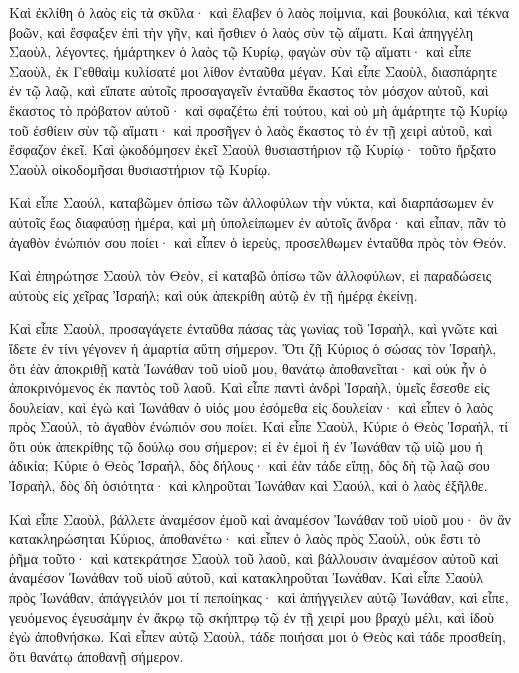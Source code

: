 {Καὶ ἐκλίθη ὁ λαὸς εἰς τὰ σκῦλα· καὶ ἔλαβεν ὁ λαὸς ποίμνια, καὶ βουκόλια, καὶ τέκνα βοῶν, καὶ ἔσφαξεν ἐπὶ τὴν γῆν, καὶ ἤσθιεν ὁ λαὸς σὺν τῷ αἵματι.
Καὶ ἀπηγγέλη Σαοὺλ, λέγοντες, ἡμάρτηκεν ὁ λαὸς τῷ Κυρίῳ, φαγὼν σὺν τῷ αἵματι· καὶ εἶπε Σαοὺλ, ἐκ Γεθθαὶμ κυλίσατέ μοι λίθον ἐνταῦθα μέγαν.
Καὶ εἶπε Σαοὺλ, διασπάρητε ἐν τῷ λαῷ, καὶ εἴπατε αὐτοῖς προσαγαγεῖν ἐνταῦθα ἕκαστος τὸν μόσχον αὑτοῦ, καὶ ἕκαστος τὸ πρόβατον αὑτοῦ· καὶ σφαζέτω ἐπὶ τούτου, καὶ οὐ μὴ ἁμάρτητε τῷ Κυρίῳ τοῦ ἐσθίειν σὺν τῷ αἵματι· καὶ προσῆγεν ὁ λαὸς ἕκαστος τὸ ἐν τῇ χειρὶ αὐτοῦ, καὶ ἔσφαζον ἐκεῖ.
Καὶ ᾠκοδόμησεν ἐκεῖ Σαοὺλ θυσιαστήριον τῷ Κυρίῳ· τοῦτο ἤρξατο Σαοὺλ οἰκοδομῆσαι θυσιαστήριον τῷ Κυρίῳ.
\par }{\PP {}Καὶ εἶπε Σαούλ, καταβῶμεν ὀπίσω τῶν ἀλλοφύλων τὴν νύκτα, καὶ διαρπάσωμεν ἐν αὐτοῖς ἕως διαφαύσῃ ἡμέρα, καὶ μὴ ὑπολείπωμεν ἐν αὐτοῖς ἄνδρα· καὶ εἶπαν, πᾶν τὸ ἀγαθὸν ἐνώπιόν σου ποίει· καὶ εἶπεν ὁ ἱερεὺς, προσελθωμεν ἐνταῦθα πρὸς τὸν Θεόν.
\par }{\PP {}Καὶ ἐπηρώτησε Σαοὺλ τὸν Θεὸν, εἰ καταβῶ ὀπίσω τῶν ἀλλοφύλων, εἰ παραδώσεις αὐτοὺς εἰς χεῖρας Ἰσραήλ; καὶ οὐκ ἀπεκρίθη αὐτῷ ἐν τῇ ἡμέρᾳ ἐκείνῃ.
\par }{\PP {}Καὶ εἶπε Σαοὺλ, προσαγάγετε ἐνταῦθα πάσας τὰς γωνίας τοῦ Ἰσραὴλ, καὶ γνῶτε καὶ ἴδετε ἐν τίνι γέγονεν ἡ ἁμαρτία αὕτη σήμερον.
Ὅτι ζῇ Κύριος ὁ σώσας τὸν Ἰσραὴλ, ὅτι ἐὰν ἀποκριθῇ κατὰ Ἰωνάθαν τοῦ υἱοῦ μου, θανάτῳ ἀποθανεῖται· καὶ οὐκ ἦν ὁ ἀποκρινόμενος ἐκ παντὸς τοῦ λαοῦ.
Καὶ εἶπε παντὶ ἀνδρὶ Ἰσραὴλ, ὑμεῖς ἔσεσθε εἰς δουλείαν, καὶ ἐγὼ καὶ Ἰωνάθαν ὁ υἱός μου ἐσόμεθα εἰς δουλείαν· καὶ εἶπεν ὁ λαὸς πρὸς Σαούλ, τὸ ἀγαθὸν ἐνώπιόν σου ποίει.
Καὶ εἶπε Σαοὺλ, Κύριε ὁ Θεὸς Ἰσραὴλ, τί ὅτι οὐκ ἀπεκρίθης τῷ δούλῳ σου σήμερον; εἰ ἐν ἐμοὶ ἢ ἐν Ἰωνάθαν τῷ υἱῷ μου ἡ ἀδικία; Κύριε ὁ Θεὸς Ἰσραὴλ, δὸς δήλους· καὶ ἐὰν τάδε εἴπῃ, δὸς δὴ τῷ λαῷ σου Ἰσραὴλ, δὸς δὴ ὁσιότητα· καὶ κληροῦται Ἰωνάθαν καὶ Σαούλ, καὶ ὁ λαὸς ἐξῆλθε.
\par }{\PP {}Καὶ εἶπε Σαοὺλ, βάλλετε ἀναμέσον ἐμοῦ καὶ ἀναμέσον Ἰωνάθαν τοῦ υἱοῦ μου· ὃν ἂν κατακληρώσηται Κύριος, ἀποθανέτω· καὶ εἶπεν ὁ λαὸς πρὸς Σαοὺλ, οὐκ ἔστι τὸ ῥῆμα τοῦτο· καὶ κατεκράτησε Σαοὺλ τοῦ λαοῦ, καὶ βάλλουσιν ἀναμέσον αὐτοῦ καὶ ἀναμέσον Ἰωνάθαν τοῦ υἱοῦ αὐτοῦ, καὶ κατακληροῦται Ἰωνάθαν.
Καὶ εἶπε Σαοὺλ πρὸς Ἰωνάθαν, ἀπάγγειλόν μοι τί πεποίηκας· καὶ ἀπήγγειλεν αὐτῷ Ἰωνάθαν, καὶ εἶπε, γευόμενος ἐγευσάμην ἐν ἄκρῳ τῷ σκήπτρῳ τῷ ἐν τῇ χειρί μου βραχὺ μέλι, καὶ ἰδοὺ ἐγὼ ἀποθνήσκω.
Καὶ εἶπεν αὐτῷ Σαοὺλ, τάδε ποιήσαι μοι ὁ Θεὸς καὶ τάδε προσθείη, ὅτι θανάτῳ ἀποθανῇ σήμερον.
}
